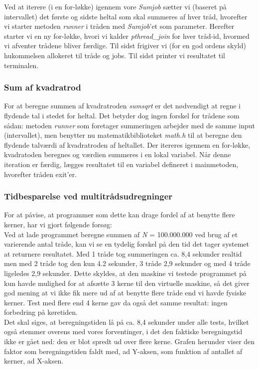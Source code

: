 \documentclass[main.tex]{subfile}
\begin{document}
Ved at iterere (i en for-løkke) igennem vore \textit{Sumjob} sætter vi (baseret på intervallet) det første og sidste heltal som skal summeres af hver tråd, hvorefter vi starter metoden \textit{runner} i tråden med \textit{Sumjob}'et som parameter. Herefter starter vi en ny for-løkke, hvori vi kalder \textit{pthread\_join} for hver tråd-id, hvormed vi afventer trådene bliver færdige. Til sidst frigiver vi (for en god ordens skyld) hukommelsen allokeret til tråde og jobs. Til sidst printer vi resultatet til terminalen.

\subsubsection{Sum af kvadratrod}
For at beregne summen af kvadratroden \textit{sumsqrt} er det nødvendigt at regne i flydende tal i stedet for heltal. Det betyder dog ingen forskel for trådene som sådan: metoden \textit{runner} som foretager summeringen arbejder med de samme input (intervallet), men benytter nu matematikbiblioteket \textit{math.h} til at beregne den flydende talværdi af kvadratroden af heltallet. Der itereres igennem en for-løkke, kvadratoden beregnes og værdien summeres i en lokal variabel. Når denne iteration er færdig, lægges resultatet til en variabel defineret i mainmetoden, hvorefter tråden exit'er.

\subsubsection{Tidbesparelse ved multitrådsudregninger}
For at påvise, at programmer som dette kan drage fordel af at benytte flere kerner, har vi gjort følgende forsøg:\\

Ved at lade programmet beregne summen af \textit{N} = 100.000.000 ved brug af et varierende antal tråde, kan vi se en tydelig forskel på den tid det tager systemet at returnere resultatet. Med 1 tråde tog summeringen ca. 8,4 sekunder realtid men med 2 tråde tog den kun 4.2 sekunder, 3 tråde 2,9 sekunder og med 4 tråde ligeledes 2,9 sekunder. Dette skyldes, at den maskine vi testede programmet på kun havde mulighed for at afsætte 3 kerne til den virtuelle maskine, så det giver god mening at vi ikke fik mere ud af at benytte flere tråde end vi havde fysiske kerner. Test med flere end 4 kerne gav da også det samme resultat: ingen forbedring på køretiden.\\

Det skal siges, at beregningstiden lå på ca. 8,4 sekunder under alle tests, hvilket også stemmer overens med vores forventinger, i det den faktiske beregningstid ikke er gået ned: den er blot spredt ud over flere kerne. Grafen herunder viser den faktor som beregningstiden faldt med, ad Y-aksen, som funktion af antallet af kerner, ad X-aksen.
\end{document}
